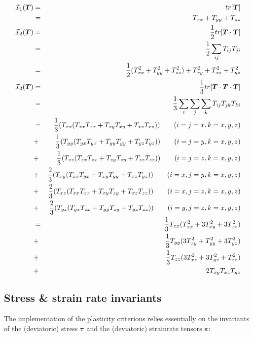 \begin{eqnarray}
{\cal I}_1({\bm T}) 
&=& tr[\bm{T}] \\
&=& T_{xx} + T_{yy} + T_{zz} \\ 
{\cal I}_2({\bm T}) 
&=& \frac{1}{2} tr[{\bm T}\cdot{\bm T}] \\
&=& \frac{1}{2} \sum_{ij} T_{ij} T_{ji} \\
&=& \frac{1}{2} (T_{xx}^2 + T_{yy}^2 + T_{zz}^2) + T_{xy}^2 + T_{xz}^2 + T_{yz}^2 \\ 
{\cal I}_3({\bm T}) 
&=& \frac{1}{3} tr[{\bm T}\cdot{\bm T}\cdot {\bm T}]   \\
&=& \frac{1}{3}\sum_i\sum_j \sum_k T_{ij} T_{jk} T_{ki}  \\
&=& \frac{1}{3} (T_{xx} ( T_{xx}T_{xx} + T_{xy}T_{xy} + T_{xz}T_{xz} )) \qquad (i=j=x,k=x,y,z)\nonumber\\ 
&+& \frac{1}{3} (T_{yy} ( T_{yx}T_{yx} + T_{yy}T_{yy} + T_{yz}T_{yz} )) \qquad (i=j=y,k=x,y,z)\nonumber\\ 
&+& \frac{1}{3} (T_{zz} ( T_{zx}T_{zx} + T_{zy}T_{zy} + T_{zz}T_{zz} )) \qquad (i=j=z,k=x,y,z)\nonumber\\ 
&+& \frac{2}{3} (T_{xy} ( T_{xx}T_{yx} + T_{xy}T_{yy} + T_{xz}T_{yz} )) \qquad (i=x,j=y,k=x,y,z)\nonumber\\ 
&+& \frac{2}{3} (T_{xz} ( T_{xx}T_{zx} + T_{xy}T_{zy} + T_{xz}T_{zz} )) \qquad (i=x,j=z,k=x,y,z)\nonumber\\ 
&+& \frac{2}{3} (T_{yz} ( T_{yx}T_{zx} + T_{yy}T_{zy} + T_{yz}T_{zz} )) \qquad (i=y,j=z,k=x,y,z)\nonumber\\ 
&=& \frac{1}{3} T_{xx} (  T_{xx}^2 + 3 T_{xy}^2 + 3 T_{xz}^2  )     \nonumber\\
&+& \frac{1}{3} T_{yy} (3 T_{xy}^2 +   T_{yy}^2 + 3 T_{yz}^2  )     \nonumber\\
&+& \frac{1}{3} T_{zz} (3 T_{xz}^2 + 3 T_{yz}^2 +   T_{zz}^2)       \nonumber\\
&+& 2 T_{xy} T_{xz} T_{yz}  
\end{eqnarray}




\subsection{Stress \& strain rate invariants}\label{sec:stress_invariants}

The implementation of the plasticity criterions relies essentially 
on the invariants of the (deviatoric) stress ${\bm \tau}$ 
and the (deviatoric) strainrate tensors $\dot{\bm \varepsilon}$:

